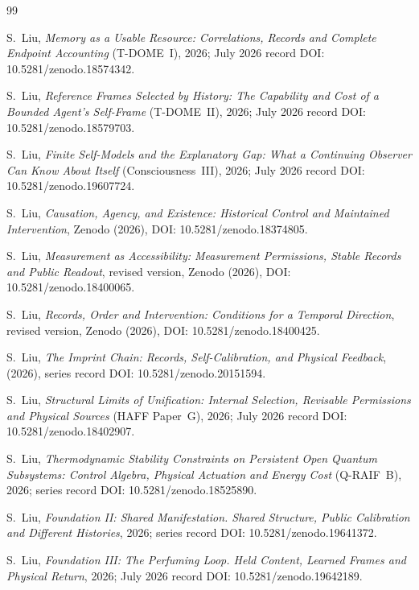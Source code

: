 \documentclass[12pt]{article}
\theoremstyle{definition}
\begin{document}
\begin{thebibliography}{99}

S.~Liu, \emph{Memory as a Usable Resource: Correlations, Records and Complete Endpoint Accounting} (T-DOME~I), 2026; July 2026 record DOI: 10.5281/zenodo.18574342.

S.~Liu, \emph{Reference Frames Selected by History: The Capability and Cost of a Bounded Agent's Self-Frame} (T-DOME~II), 2026; July 2026 record DOI: 10.5281/zenodo.18579703.

S.~Liu, \emph{Finite Self-Models and the Explanatory Gap: What a Continuing Observer Can Know About Itself} (Consciousness~III), 2026; July 2026 record DOI: 10.5281/zenodo.19607724.

S.~Liu, \emph{Causation, Agency, and Existence: Historical Control and Maintained Intervention}, Zenodo (2026), DOI: 10.5281/zenodo.18374805.

S.~Liu, \emph{Measurement as Accessibility: Measurement Permissions, Stable Records and Public Readout}, revised version, Zenodo (2026), DOI: 10.5281/zenodo.18400065.

S.~Liu, \emph{Records, Order and Intervention: Conditions for a Temporal Direction}, revised version, Zenodo (2026), DOI: 10.5281/zenodo.18400425.

S.~Liu, \emph{The Imprint Chain: Records, Self-Calibration, and Physical Feedback}, (2026), series record DOI: 10.5281/zenodo.20151594.

S.~Liu, \emph{Structural Limits of Unification: Internal Selection, Revisable Permissions and Physical Sources} (HAFF Paper~G), 2026; July 2026 record DOI: 10.5281/zenodo.18402907.

S.~Liu, \emph{Thermodynamic Stability Constraints on Persistent Open Quantum Subsystems: Control Algebra, Physical Actuation and Energy Cost} (Q-RAIF~B), 2026; series record DOI: 10.5281/zenodo.18525890.

S.~Liu, \emph{Foundation II: Shared Manifestation. Shared Structure, Public Calibration and Different Histories}, 2026; series record DOI: 10.5281/zenodo.19641372.

S.~Liu, \emph{Foundation III: The Perfuming Loop. Held Content, Learned Frames and Physical Return}, 2026; July 2026 record DOI: 10.5281/zenodo.19642189.


\end{thebibliography}
\end{document}
